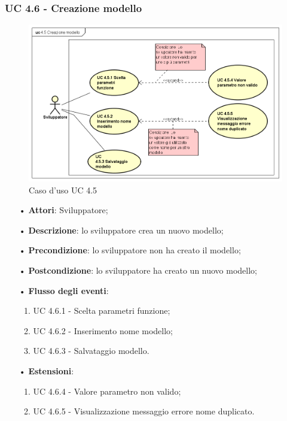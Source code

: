 \subsubsection{UC 4.6 - Creazione modello}
\begin{figure}[H]
	\centering
	\includegraphics[width=17cm]{img/UC450.png} 
	\caption{Caso d'uso UC 4.5}\label{fig:450}
\end{figure}
\begin{itemize}
	\item[•]\textbf{Attori}: Sviluppatore;
	\item[•]\textbf{Descrizione}: lo sviluppatore crea un nuovo modello;
	\item[•]\textbf{Precondizione}: lo sviluppatore non ha creato il modello;
	\item[•]\textbf{Postcondizione}: lo sviluppatore ha creato un nuovo modello;
	\item[•]\textbf{Flusso degli eventi}:  
	\begin{enumerate}
		\item UC 4.6.1 - Scelta parametri funzione;
		\item UC 4.6.2 - Inserimento nome modello;
		\item UC 4.6.3 - Salvataggio modello.
	\end{enumerate}
	\item[•]\textbf{Estensioni}:  
	\begin{enumerate}
		\item UC 4.6.4 - Valore parametro non valido;
		\item UC 4.6.5 - Visualizzazione messaggio errore nome duplicato.
	\end{enumerate}
\end{itemize}

